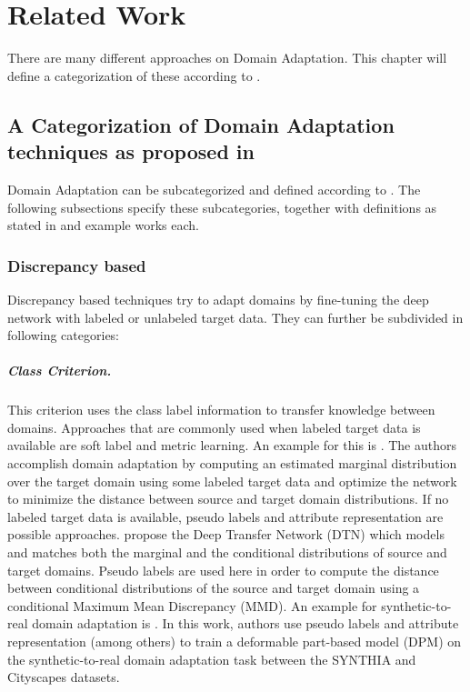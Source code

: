 \chapter{Related Work}
\label{sec:related_work}
There are many different approaches on Domain Adaptation. This chapter will define a categorization of these according to \cite{DBLP:journals/corr/Csurka17}.

\section{A Categorization of Domain Adaptation techniques as proposed in \cite{DBLP:journals/corr/Csurka17}}
Domain Adaptation can be subcategorized and defined according to \cite{DBLP:journals/corr/Csurka17}. The following subsections specify these subcategories, together with definitions as stated in \cite{DBLP:journals/corr/abs-1802-03601} and example works each.

\subsection{Discrepancy based}
Discrepancy based techniques try to adapt domains by fine-tuning the deep network with labeled or unlabeled target data. They can further be subdivided in following categories:

\paragraph{Class Criterion.}
This criterion uses the class label information to transfer knowledge between domains. Approaches that are commonly used when labeled target data is available are soft label and metric learning. An example for this is \cite{DBLP:journals/corr/TzengHDS15}. The authors accomplish domain adaptation by computing an estimated marginal distribution over the target domain using some labeled target data and optimize the network to minimize the distance between source and target domain distributions. If no labeled target data is available, pseudo labels and attribute representation are possible approaches. \cite{DBLP:journals/corr/ZhangYCW15} propose the Deep Transfer Network (DTN) which models and matches both the marginal and the conditional distributions of source and target domains. Pseudo labels are used here in order to compute the distance between conditional distributions of the source and target domain using a conditional Maximum Mean Discrepancy (MMD). An example for synthetic-to-real domain adaptation is \cite{DBLP:journals/corr/LopezXGVR16}. In this work, authors use pseudo labels and attribute representation (among others) to train a deformable part-based model (DPM) on the synthetic-to-real domain adaptation task between the SYNTHIA \cite{RosCVPR16} and Cityscapes \cite{Cordts_2016_CVPR} datasets.


